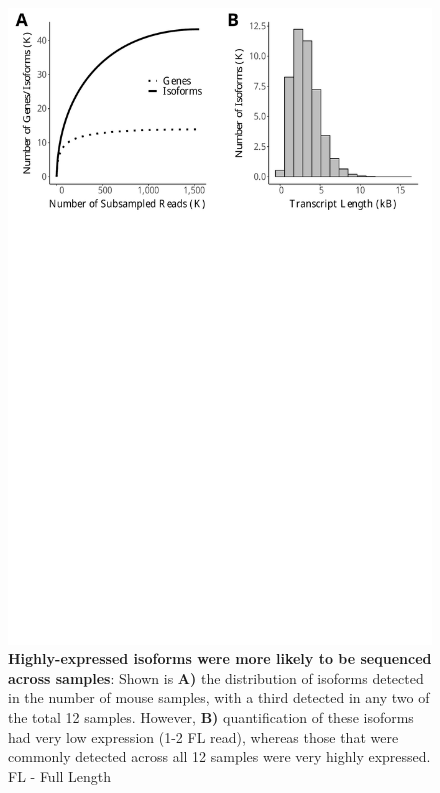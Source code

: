 \vspace{1cm}
\begin{figure}[!h]
	\begin{center}
		\includegraphics[page=2,trim={0 26cm 0 0},clip,scale = 0.55]{Figures/IsoSeqWholeTranscriptome.pdf}
	\end{center}
	\captionsetup{width=0.95\textwidth}
	\caption[Isoform diversity across Tg4510 samples and coverage of ERCC transcripts]%
	{\textbf{Highly-expressed isoforms were more likely to be sequenced across samples}: Shown is \textbf{A)} the distribution of isoforms detected in the number of mouse samples, with a third detected in any two of the total 12 samples. However, \textbf{B)} quantification of these isoforms had very low expression (1-2 FL read), whereas those that were commonly detected across all 12 samples were very highly expressed. FL - Full Length}
	\label{fig:isoseq_whole_lowlyexp}
\end{figure}

